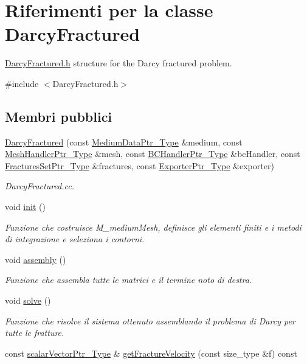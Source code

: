 \hypertarget{classDarcyFractured}{\section{Riferimenti per la classe Darcy\-Fractured}
\label{classDarcyFractured}
}


\hyperlink{DarcyFractured_8h}{Darcy\-Fractured.\-h} structure for the Darcy fractured problem.  




{\ttfamily \#include $<$Darcy\-Fractured.\-h$>$}

\subsection*{Membri pubblici}
\begin{DoxyCompactItemize}
\item 
\hyperlink{classDarcyFractured_accc03f979ab787754e26d9f06b553c96}{Darcy\-Fractured} (const \hyperlink{MediumData_8h_ab4e5446269b79f019405fbe1b6e4b1fe}{Medium\-Data\-Ptr\-\_\-\-Type} \&medium, const \hyperlink{MeshHandler_8h_a1e5fc39dfda19e81b21756ab7719ef4c}{Mesh\-Handler\-Ptr\-\_\-\-Type} \&mesh, const \hyperlink{BCHandler_8h_aa175884cb453788647f17f2230a2a762}{B\-C\-Handler\-Ptr\-\_\-\-Type} \&bc\-Handler, const \hyperlink{FracturesSet_8h_ac29a2a91d3af77fb459980a7db47f420}{Fractures\-Set\-Ptr\-\_\-\-Type} \&fractures, const \hyperlink{Exporter_8h_ac9d7f94fea8b91459a536bfaa2f3910c}{Exporter\-Ptr\-\_\-\-Type} \&exporter)
\begin{DoxyCompactList}\small\item\em Darcy\-Fractured.\-cc. \end{DoxyCompactList}\item 
void \hyperlink{classDarcyFractured_a7832c9317b9764da96fc8ee112860824}{init} ()
\begin{DoxyCompactList}\small\item\em Funzione che costruisce M\-\_\-medium\-Mesh, definisce gli elementi finiti e i metodi di integrazione e seleziona i contorni. \end{DoxyCompactList}\item 
void \hyperlink{classDarcyFractured_a1e218bc0eda8f55db644dda95503491b}{assembly} ()
\begin{DoxyCompactList}\small\item\em Funzione che assembla tutte le matrici e il termine noto di destra. \end{DoxyCompactList}\item 
void \hyperlink{classDarcyFractured_a074b6ec717f783c731b2be89f6528cc0}{solve} ()
\begin{DoxyCompactList}\small\item\em Funzione che risolve il sistema ottenuto assemblando il problema di Darcy per tutte le fratture. \end{DoxyCompactList}\item 
const \hyperlink{Core_8h_ab09b6fa3c23db1b8c60456f8690c44a7}{scalar\-Vector\-Ptr\-\_\-\-Type} \& \hyperlink{classDarcyFractured_a7ea359d5998a00804db8fc1ae1f4739a}{get\-Fracture\-Velocity} (const size\-\_\-type \&f) const 
\end{DoxyCompactItemize}



